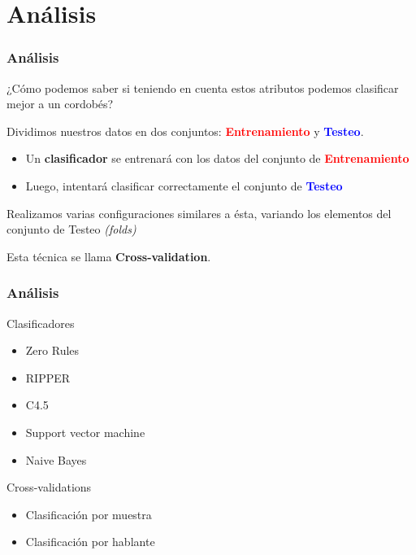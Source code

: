 \documentclass[mathserif]{beamer}%
\begin{document}
\section{Análisis}

\begin{frame}
	\frametitle{Análisis}
	
	\begin{center}
		\Large {¿Cómo podemos saber si teniendo en cuenta estos atributos podemos clasificar mejor a un cordobés?}
		
	\end{center}
	
	\pause
	
	Dividimos nuestros datos en dos conjuntos: \textcolor{red}{\textbf{Entrenamiento}} y \textcolor{blue}{\textbf{Testeo}}.
	
	\begin{itemize}
		\item Un \textbf{clasificador} se entrenará con los datos del conjunto de \textcolor{red}{\textbf{Entrenamiento}}
		\item Luego, intentará clasificar correctamente el conjunto de \textcolor{blue}{\textbf{Testeo}}
	\end{itemize}
	
	Realizamos varias configuraciones similares a ésta, variando los elementos del conjunto de Testeo \textit{(folds)}
	
	Esta técnica se llama \textbf{Cross-validation}.

\end{frame}

\begin{frame}
	\frametitle{Análisis}

	\Large {Clasificadores}
	\begin{itemize}
		\item Zero Rules
		\item RIPPER
		\item C4.5
		\item Support vector machine
		\item Naive Bayes
	\end{itemize}
	
	\Large {Cross-validations}
	\begin{itemize}
		\item Clasificación por muestra 
		\item Clasificación por hablante
	\end{itemize}
	
\end{frame}
\end{document}
